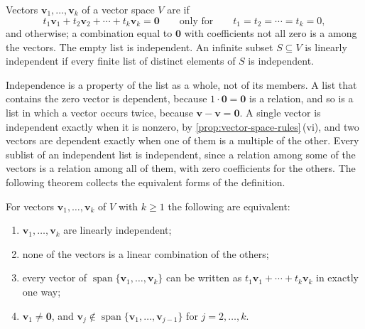 \begin{definition}
\label{def:independence}
Vectors $\mathbf v_1,\ldots,\mathbf v_k$ of a vector space $V$ are  if
\[
t_1\mathbf v_1+t_2\mathbf v_2+\cdots+t_k\mathbf v_k=\mathbf 0\qquad\text{only for}\qquad t_1=t_2=\cdots=t_k=0,
\]
and  otherwise; a combination equal to $\mathbf 0$ with coefficients not all zero is a  among the vectors. The empty list is independent. An infinite subset $S\subseteq V$ is linearly independent if every finite list of distinct elements of $S$ is independent.
\end{definition}

Independence is a property of the list as a whole, not of its members. A list that contains the zero vector is dependent, because $1\cdot\mathbf 0=\mathbf 0$ is a relation, and so is a list in which a vector occurs twice, because $\mathbf v-\mathbf v=\mathbf 0$. A single vector is independent exactly when it is nonzero, by \cref{prop:vector-space-rules}\,(vi), and two vectors are dependent exactly when one of them is a multiple of the other. Every sublist of an independent list is independent, since a relation among some of the vectors is a relation among all of them, with zero coefficients for the others. The following theorem collects the equivalent forms of the definition.

\begin{theorem}
\label{thm:independence}
For vectors $\mathbf v_1,\ldots,\mathbf v_k$ of $V$ with $k\ge1$ the following are equivalent:
\begin{enumerate}
\item $\mathbf v_1,\ldots,\mathbf v_k$ are linearly independent;
\item none of the vectors is a linear combination of the others;
\item every vector of $\operatorname{span}\{\mathbf v_1,\ldots,\mathbf v_k\}$ can be written as $t_1\mathbf v_1+\cdots+t_k\mathbf v_k$ in exactly one way;
\item $\mathbf v_1\ne\mathbf 0$, and $\mathbf v_j\notin\operatorname{span}\{\mathbf v_1,\ldots,\mathbf v_{j-1}\}$ for $j=2,\ldots,k$.
\end{enumerate}
\end{theorem}


